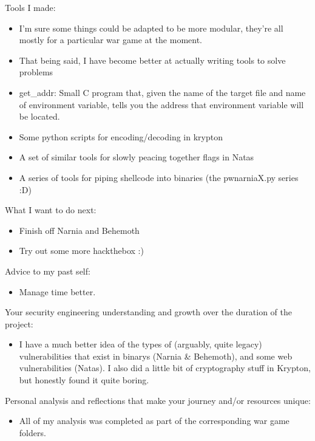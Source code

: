 \documentclass{article}
\begin{document}
Tools I made:

\begin{itemize}
	\item I'm sure some things could be adapted to be more modular, they're all mostly for a particular war game at the moment.
	\item That being said, I have become better at actually writing tools to solve problems
	\item get\_addr: Small C program that, given the name of the target file and name of environment variable, tells you the address that environment variable will be located.
	\item Some python scripts for encoding/decoding in krypton
	\item A set of similar tools for slowly peacing together flags in Natas
	\item A series of tools for piping shellcode into binaries (the pwnarniaX.py series :D) 
\end{itemize}

What I want to do next:

\begin{itemize}
	\item Finish off Narnia and Behemoth
	\item Try out some more hackthebox :)
\end{itemize}

Advice to my past self:
	
\begin{itemize}
	\item Manage time better.
\end{itemize}

Your security engineering understanding and growth over the duration of the project:

\begin{itemize}
	\item I have a much better idea of the types of (arguably, quite legacy) vulnerabilities that exist in binarys (Narnia \& Behemoth), and some web vulnerabilities (Natas). I also did a little bit of cryptography stuff in Krypton, but honestly found it quite boring.
\end{itemize}

Personal analysis and reflections that make your journey and/or resources unique:

\begin{itemize}
	\item All of my analysis was completed as part of the corresponding war game folders.
\end{itemize}
\end{document}
